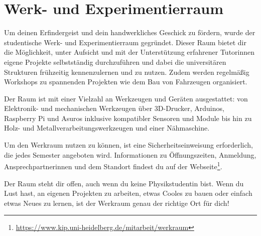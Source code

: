 \section{Werk- und Experimentierraum}
\label{werk-und-experimentierraum}

Um deinen Erfindergeist und dein handwerkliches Geschick zu fördern, wurde der studentische Werk- und Experimentierraum gegründet. Dieser Raum bietet dir die Möglichkeit, unter Aufsicht und mit der Unterstützung erfahrener Tutorinnen eigene Projekte selbstständig durchzuführen und dabei die universitären Strukturen frühzeitig kennenzulernen und zu nutzen. Zudem werden regelmäßig Workshops zu spannenden Projekten wie dem Bau von Fahrzeugen organisiert.

Der Raum ist mit einer Vielzahl an Werkzeugen und Geräten ausgestattet: von Elektronik- und mechanischen Werkzeugen über 3D-Drucker, Arduinos, Raspberry Pi und Asuros inklusive kompatibler Sensoren und Module bis hin zu Holz- und Metallverarbeitungswerkzeugen und einer Nähmaschine.

Um den Werkraum nutzen zu können, ist eine Sicherheitseinweisung erforderlich, die jedes Semester angeboten wird. Informationen zu Öffnungszeiten, Anmeldung, Ansprechpartnerinnen und dem Standort findest du auf der Webseite\footnote{\url{https://www.kip.uni-heidelberg.de/mitarbeit/werkraum}}.

Der Raum steht dir offen, auch wenn du keine Physikstudentin bist. Wenn du Lust hast, an eigenen Projekten zu arbeiten, etwas Cooles zu bauen oder einfach etwas Neues zu lernen, ist der Werkraum genau der richtige Ort für dich!

